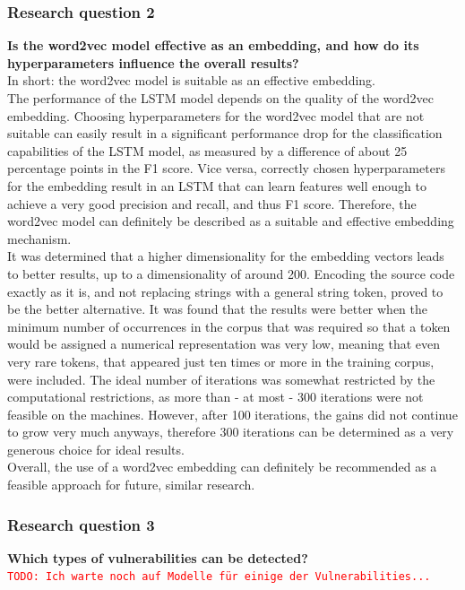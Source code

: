 \documentclass[
	a4paper,
	pagesize,
	pdftex,
	12pt,
	twoside, %
	BCOR=5mm, %
	ngerman,
	fleqn,
	final,
	]{scrartcl}
\begin{document}
\subsubsection{Research question 2}
\textbf{Is the word2vec model effective as an embedding, and how do its hyperparameters influence the overall results?}\\
In short: the word2vec model is suitable as an effective embedding.\\
The performance of the LSTM model depends on the quality of the word2vec embedding. Choosing hyperparameters for the word2vec model that are not suitable can easily result in a significant performance drop for the classification capabilities of the LSTM model, as measured by a difference of about 25 percentage points in the F1 score. Vice versa, correctly chosen hyperparameters for the embedding result in an LSTM that can learn features well enough to achieve a very good precision and recall, and thus F1 score. Therefore, the word2vec model can definitely be described as a suitable and effective embedding mechanism.\\
It was determined that a higher dimensionality for the embedding vectors leads to better results, up to a dimensionality of around 200. Encoding the source code exactly as it is, and not replacing strings with a general string token, proved to be the better alternative. It was found that the results were better when the minimum number of occurrences in the corpus that was required so that a token would be assigned a numerical representation was very low, meaning that even very rare tokens, that appeared just ten times or more in the training corpus, were included. The ideal number of iterations was somewhat restricted by the computational restrictions, as more than - at most - 300 iterations were not feasible on the machines. However, after 100 iterations, the gains did not continue to grow very much anyways, therefore 300 iterations can be determined as a very generous choice for ideal results.\\
Overall, the use of a word2vec embedding can definitely be recommended as a feasible approach for future, similar research. 

\subsubsection{Research question 3}
\textbf{Which types of vulnerabilities can be detected?}\\
\textcolor{red}{\texttt{TODO: Ich warte noch auf Modelle für einige der Vulnerabilities...}}
\end{document}
